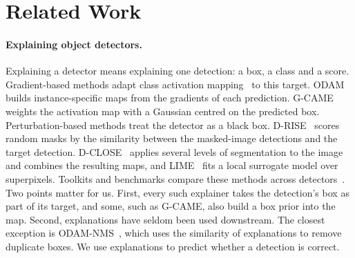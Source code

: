 \section{Related Work}
\label{sec:related}

\paragraph{Explaining object detectors.}
Explaining a detector means explaining one detection: a box, a class and a
score. Gradient-based methods adapt class activation
mapping~\cite{selvaraju2017gradcam} to this target.
ODAM~\cite{zhao2023odam} builds instance-specific maps from the gradients of
each prediction. G-CAME~\cite{nguyen2024gcame} weights the activation map
with a Gaussian centred on the predicted box.
Perturbation-based methods treat the detector as a black box.
D-RISE~\cite{petsiuk2021drise} scores random masks by the similarity between
the masked-image detections and the target detection.
D-CLOSE~\cite{truong2023dclose} applies several levels of segmentation to the
image and combines the resulting maps, and LIME~\cite{ribeiro2016lime}
fits a local surrogate model over superpixels.
Toolkits and benchmarks compare these methods across
detectors~\cite{padmanabhan2022dext,nguyen2025odexai}.
Two points matter for us. First, every such explainer takes the detection's
box as part of its target, and some, such as G-CAME, also build a box prior
into the map. Second, explanations have seldom been used downstream. The
closest exception is ODAM-NMS~\cite{zhao2023odam}, which uses the similarity
of explanations to remove duplicate boxes. We use explanations to predict
whether a detection is correct.

